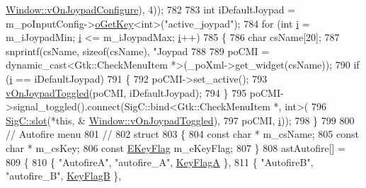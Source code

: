 \begin{DoxyCode}
{{      \mbox{\hyperlink{class_v_b_a_1_1_window_a9a72206ce2e6c13d5bd66863292f9515}{Window::vOnJoypadConfigure}}), 4));
782 
783   \textcolor{keywordtype}{int} iDefaultJoypad = m\_poInputConfig->\mbox{\hyperlink{class_v_b_a_1_1_config_1_1_section_ab169d7aae4e9dde91418ba1668e3ad39}{oGetKey}}<\textcolor{keywordtype}{int}>(\textcolor{stringliteral}{"active\_joypad"});
784   \textcolor{keywordflow}{for} (\textcolor{keywordtype}{int} \mbox{\hyperlink{expr-lex_8cpp_acb559820d9ca11295b4500f179ef6392}{i}} = m\_iJoypadMin; \mbox{\hyperlink{expr-lex_8cpp_acb559820d9ca11295b4500f179ef6392}{i}} <= m\_iJoypadMax; \mbox{\hyperlink{expr-lex_8cpp_acb559820d9ca11295b4500f179ef6392}{i}}++)
785   \{
786     \textcolor{keywordtype}{char} csName[20];
787     snprintf(csName, \textcolor{keyword}{sizeof}(csName), \textcolor{stringliteral}{"Joypad%
788 
789     poCMI = \textcolor{keyword}{dynamic\_cast<}Gtk::CheckMenuItem *\textcolor{keyword}{>}(\_poXml->get\_widget(csName));
790     \textcolor{keywordflow}{if} (\mbox{\hyperlink{expr-lex_8cpp_acb559820d9ca11295b4500f179ef6392}{i}} == iDefaultJoypad)
791     \{
792       poCMI->set\_active();
793       \mbox{\hyperlink{class_v_b_a_1_1_window_a38491fe3a0daf6be7ab610fd282d2e47}{vOnJoypadToggled}}(poCMI, iDefaultJoypad);
794     \}
795     poCMI->signal\_toggled().connect(SigC::bind<Gtk::CheckMenuItem *, int>(
796                                       \mbox{\hyperlink{namespace_sig_c_a92e4f19202b77e78ac1db05f5a62f6b6}{SigC::slot}}(*\textcolor{keyword}{this}, &
      \mbox{\hyperlink{class_v_b_a_1_1_window_a38491fe3a0daf6be7ab610fd282d2e47}{Window::vOnJoypadToggled}}),
797                                       poCMI, \mbox{\hyperlink{expr-lex_8cpp_acb559820d9ca11295b4500f179ef6392}{i}}));
798   \}
799 
800   \textcolor{comment}{// Autofire menu}
801   \textcolor{comment}{//}
802   \textcolor{keyword}{struct}
803   \{
804     \textcolor{keyword}{const} \textcolor{keywordtype}{char} *   m\_csName;
805     \textcolor{keyword}{const} \textcolor{keywordtype}{char} *   m\_csKey;
806     \textcolor{keyword}{const} \mbox{\hyperlink{class_v_b_a_a20a8479ee93dc52b1fbd911a13cb30a5}{EKeyFlag}} m\_eKeyFlag;
807   \}
808   astAutofire[] =
809   \{
810     \{ \textcolor{stringliteral}{"AutofireA"}, \textcolor{stringliteral}{"autofire\_A"}, \mbox{\hyperlink{class_v_b_a_a20a8479ee93dc52b1fbd911a13cb30a5a4006161734414cc3ea97edc3105c8231}{KeyFlagA}} \},
811     \{ \textcolor{stringliteral}{"AutofireB"}, \textcolor{stringliteral}{"autofire\_B"}, \mbox{\hyperlink{class_v_b_a_a20a8479ee93dc52b1fbd911a13cb30a5a94baf7a0d970d139d3617120b54dd2b9}{KeyFlagB}} \},
}}}
\end{DoxyCode}
